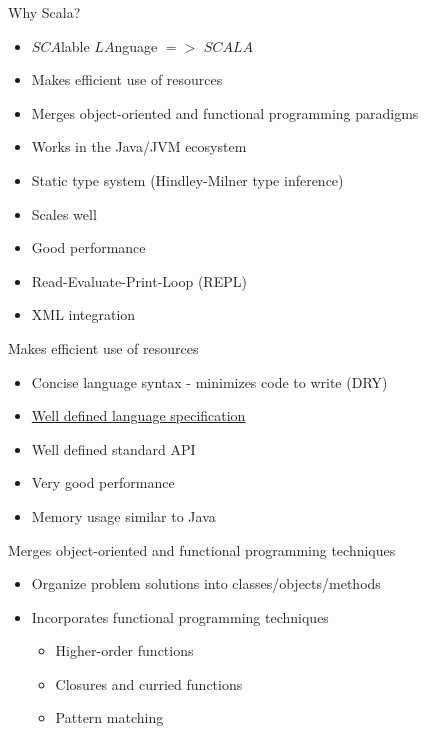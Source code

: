 \documentclass[t]{beamer}
\begin{document}
\begin{frame}{Why Scala?}
  
  \begin{itemize}
  \item $SCA$lable $LA$nguage $=>$ $SCALA$
  \item Makes efficient use of resources
  \item Merges object-oriented and functional programming paradigms
  \item Works in the Java/JVM ecosystem
  \item Static type system (Hindley-Milner type inference)
  \item Scales well
  \item Good performance
  \item Read-Evaluate-Print-Loop (REPL)
  \item XML integration
  \end{itemize}
 \end{frame}

\begin{frame}{Makes efficient use of resources}
  \begin{itemize}
  \item Concise language syntax - minimizes code to write (DRY)
  \item \href{http://www.scala-lang.org/sites/default/files/linuxsoft_archives/docu/files/ScalaReference.pdf}{Well defined language specification}
  \item Well defined standard API
  \item Very good performance
  \item Memory usage similar to Java
  \end{itemize}
\note{}
 \end{frame}

\begin{frame}{Merges object-oriented and functional programming techniques}
  \begin{itemize}
  \item Organize problem solutions into classes/objects/methods
  \item Incorporates functional programming techniques
    \begin{itemize}
    \item Higher-order functions
    \item Closures and curried functions
    \item Pattern matching
    \end{itemize}
  \end{itemize}
  \note{}
\end{frame}
\end{document}
